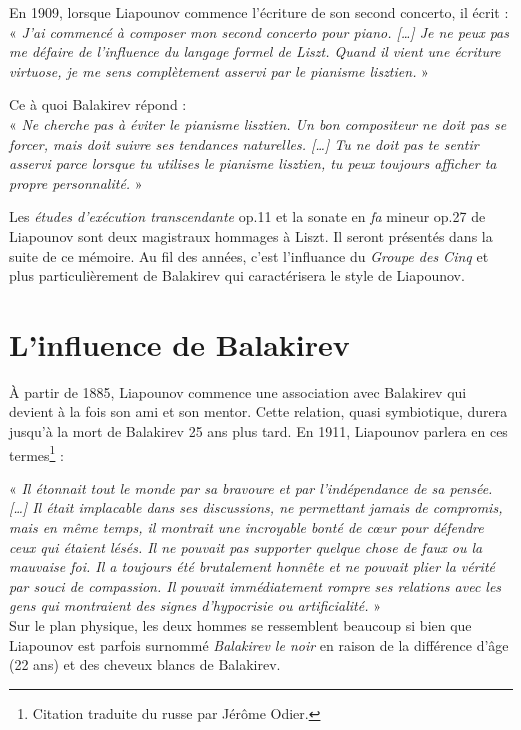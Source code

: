 \indent En 1909, lorsque Liapounov commence l'écriture de son second concerto, il écrit :\\
\indent« \emph{J'ai commencé à composer mon second concerto pour piano. [\dots] Je ne peux pas me défaire de l'influence du langage formel de Liszt. Quand il vient une écriture virtuose, je me sens complètement asservi par le pianisme lisztien.} »\\

\vspace*{-0.25cm}

\indent Ce à quoi Balakirev répond :\\
\indent« \emph{Ne cherche pas à éviter le pianisme lisztien. Un bon compositeur ne doit pas se forcer, mais doit suivre ses tendances naturelles. [\dots] Tu ne doit pas te sentir asservi parce lorsque tu utilises le pianisme lisztien, tu peux toujours afficher ta propre personnalité.} »

Les \emph{études d'exécution transcendante} op.11 et la sonate en \emph{fa} mineur op.27 de Liapounov sont deux magistraux hommages à Liszt. Il seront présentés dans la suite de ce mémoire. Au fil des années, c'est l'influance du \emph{Groupe des Cinq} et plus particulièrement de Balakirev qui caractérisera le style de Liapounov.

\section{L'influence de Balakirev}

À partir de 1885, Liapounov commence une association avec Balakirev qui devient à la fois son ami et son mentor. Cette relation, quasi symbiotique, durera jusqu'à la mort de Balakirev 25 ans plus tard. En 1911, Liapounov parlera en ces termes\footnote{Citation traduite du russe par Jérôme Odier.} :

« \emph{Il étonnait tout le monde par sa bravoure et par l'indépendance de sa pensée. [\dots] Il était implacable dans ses discussions, ne permettant jamais de compromis, mais en même temps, il montrait une incroyable bonté de cœur pour défendre ceux qui étaient lésés. Il ne pouvait pas supporter quelque chose de faux ou la mauvaise foi. Il a toujours été brutalement honnête et ne pouvait plier la vérité par souci de compassion. Il pouvait immédiatement rompre ses relations avec les gens qui montraient des signes d'hypocrisie ou artificialité.} »\\

Sur le plan physique, les deux hommes se ressemblent beaucoup si bien que Liapounov est parfois surnommé \emph{Balakirev le noir} en raison de la différence d'âge (22 ans) et des cheveux blancs de Balakirev.

